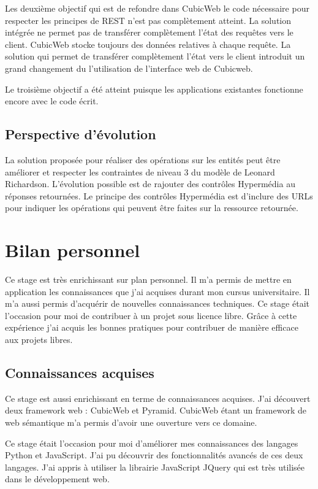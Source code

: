 Les deuxième objectif qui est de refondre dans CubicWeb le code nécessaire pour respecter les principes de REST n'est pas complètement atteint. La solution intégrée ne permet pas de transférer complètement l'état des requêtes vers le client. CubicWeb stocke toujours des données relatives à chaque requête. La solution qui permet de transférer complètement l'état vers le client introduit un grand changement du l'utilisation de l'interface web de Cubicweb. 

Le troisième objectif a été atteint puisque les applications existantes fonctionne encore avec le code écrit.

\subsection{Perspective d'évolution}
La solution proposée pour réaliser des opérations  sur les entités peut être améliorer et respecter les contraintes de niveau 3 du modèle de Leonard Richardson. L'évolution possible est de rajouter des contrôles Hypermédia au réponses retournées. Le principe des contrôles Hypermédia est d'inclure des URLs pour indiquer les opérations qui peuvent être faites sur la ressource retournée. 

\section{Bilan personnel}
Ce stage est très enrichissant sur plan personnel. Il m'a permis de mettre en application les connaissances que j'ai acquises durant mon cursus universitaire. Il m'a aussi permis d'acquérir de nouvelles connaissances techniques. Ce stage était l'occasion pour moi de contribuer à un projet sous licence libre. Grâce à cette expérience j'ai acquis les bonnes pratiques pour contribuer de manière efficace aux projets libres.  
\subsection{Connaissances acquises}
Ce stage est aussi enrichissant en terme de connaissances acquises. J'ai découvert deux framework web : CubicWeb et Pyramid. CubicWeb étant un framework de web sémantique m'a permis d'avoir une ouverture vers ce domaine. 

Ce stage était l'occasion pour moi d'améliorer mes connaissances des langages Python et JavaScript. J'ai pu découvrir des fonctionnalités avancés de ces deux langages. J'ai appris à utiliser la librairie JavaScript JQuery qui est très utilisée dans le développement web. 

